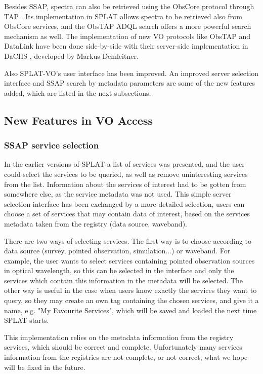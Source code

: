 \documentclass[final,authoryear,5p,times,twocolumn]{elsarticle}
\begin{document}
Besides SSAP, spectra can also be retrieved using the ObsCore protocol
through TAP \citep[known as ObsTap;][]{obstap}. Its implementation in
SPLAT allows spectra to be retrieved also from ObsCore services, and
the ObsTAP ADQL \citep{adql} search offers a more powerful search
mechanism as well. The implementation of new VO protocols like ObsTAP
and DataLink have been done side-by-side with their server-side
implementation in DaCHS \citep[Data Center Helper Suite;][]{dachs},
developed by Markus Demleitner.

Also SPLAT-VO's user interface has been improved. An improved server
selection interface and SSAP search by metadata parameters are some of
the new features added, which are listed in the next subsections.

\subsection{New Features in VO Access}

\subsubsection{SSAP service selection}

In the earlier versions of SPLAT a list of services was presented, and
the user could select the services to be queried, as well as remove
uninteresting services from the list. Information about the services
of interest had to be gotten from somewhere else, as the service
metadata was not used.  This simple server selection interface has
been exchanged by a more detailed selection, users can choose a set of
services that may contain data of interest, based on the services
metadata taken from the registry (data source, waveband).

There are two ways of selecting services. The first way is to choose
according to data source (survey, pointed observation, simulation...)
or waveband.  For example, the user wants to select services
containing pointed observation sources in optical wavelength, so this
can be selected in the interface and only the services which contain
this information in the metadata will be selected.  The other way is
useful in the case when users know exactly the services they want to
query, so they may create an own tag containing the chosen services,
and give it a name, e.g. "My Favourite Services", which will be saved
and loaded the next time SPLAT starts.

This implementation relies on the metadata information from the
registry services, which should be correct and complete. Unfortunately
many services information from the registries are not complete, or not
correct, what we hope will be fixed in the future.
\end{document}
